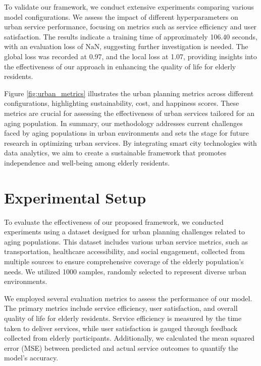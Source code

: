 \documentclass{article} %
\begin{document}
To validate our framework, we conduct extensive experiments comparing various model configurations. We assess the impact of different hyperparameters on urban service performance, focusing on metrics such as service efficiency and user satisfaction. The results indicate a training time of approximately 106.40 seconds, with an evaluation loss of \( \text{NaN} \), suggesting further investigation is needed. The global loss was recorded at 0.97, and the local loss at 1.07, providing insights into the effectiveness of our approach in enhancing the quality of life for elderly residents.

Figure \ref{fig:urban_metrics} illustrates the urban planning metrics across different configurations, highlighting sustainability, cost, and happiness scores. These metrics are crucial for assessing the effectiveness of urban services tailored for an aging population. In summary, our methodology addresses current challenges faced by aging populations in urban environments and sets the stage for future research in optimizing urban services. By integrating smart city technologies with data analytics, we aim to create a sustainable framework that promotes independence and well-being among elderly residents.

\section{Experimental Setup}
\label{sec:experimental}
To evaluate the effectiveness of our proposed framework, we conducted experiments using a dataset designed for urban planning challenges related to aging populations. This dataset includes various urban service metrics, such as transportation, healthcare accessibility, and social engagement, collected from multiple sources to ensure comprehensive coverage of the elderly population's needs. We utilized 1000 samples, randomly selected to represent diverse urban environments.

We employed several evaluation metrics to assess the performance of our model. The primary metrics include service efficiency, user satisfaction, and overall quality of life for elderly residents. Service efficiency is measured by the time taken to deliver services, while user satisfaction is gauged through feedback collected from elderly participants. Additionally, we calculated the mean squared error (MSE) between predicted and actual service outcomes to quantify the model's accuracy.
\end{document}
